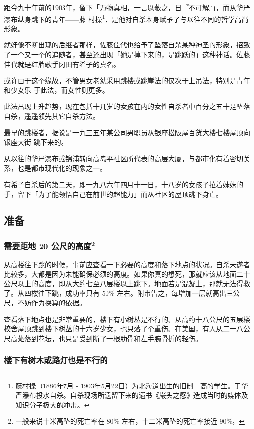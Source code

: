 \documentclass[UTF8]{ctexart}
\begin{document}
距今九十年前的1903年，留下「万物真相，一言以蔽之，日『不可解』」，而从华严瀑布纵身跳下的青年——藤
村操\footnote{藤村操（1886年7月 - 1903年5月22日）为北海道出生的旧制一高的学生。于华严瀑布投水自杀。自杀现场所遗留下来的遗书《巌头之感》造成当时的媒体及知识分子极大的冲击。}，是他对自杀本身赋予了与以往不同的哲学高尚形象。

就好像不断出现的后继者那样，佐藤佳代也给予了坠落自杀某种神圣的形象，招致了一个又一个的追随者，甚至还出现「她是掉下来的，是跳跃的」这种神话。佐藤佳代就是红牌歌手冈田有希子的真名。

或许由于这个缘故，不管男女老幼采用跳楼或跳崖法的仅次于上吊法，特别是青年和少女乐 于此法，而女性则更多。

此法出现上升趋势，现在包括十几岁的女孩在内的女性自杀者中百分之五十是坠落自杀，遥遥领先其它自杀方法。

最早的跳楼者，据说是一九三五年某公司男职员从银座松阪屋百货大楼七楼屋顶向银座大街 跳下来的。

从以往的华严瀑布或锦浦转向高岛平社区所代表的高层大厦，与都市化有着密切关系，也是都市现代化的现象之一。

有希子自杀后的第二天，即一九八六年四月十一日，十八岁的女孩子拉着妹妹的手，留下「为了能领悟自己在前世的超能力」而从社区的屋顶跳下身亡。

\subsection{准备}

\subsubsection*{需要距地 20 公尺的高度\footnote{一般来说十米高坠的死亡率在 $80\%$ 左右，十二米高坠的死亡率接近 $90\%$。}}

从高楼往下跳的时候，事前应查看一下必要的高度和落下地点的状况。自杀未遂者比较多，大都是因为未能确保必须的高度。如果你真的想死，那就应该从地面二十公尺以上的高度，即从大约七至八层楼以上跳下。地面若是混凝土，那就无法得救了。从四楼往下跳，成功率只有 $50\%$ 左右。附带告之，每增加一层就高出三公尺，不妨作为换算的依据。

查看落下地点也是非常重要的，楼下有小树丛是不行的。从高约十八公尺的五层楼校舍屋顶跳到楼下树丛的十六岁少女，也只落了个重伤。在美国，有人从二十八公尺高处落到花坛，也只是受到断了一根肋骨和左手腕骨折的轻伤。

\subsubsection*{楼下有树木或路灯也是不行的}
\end{document}
